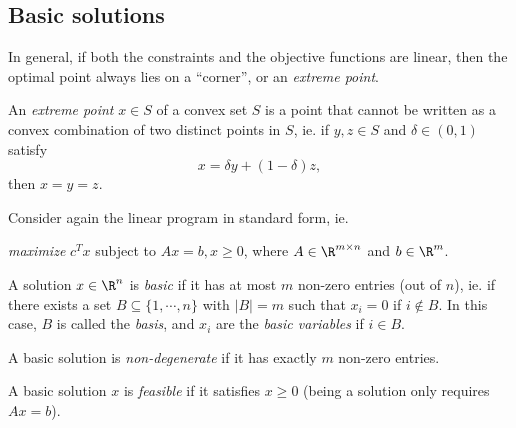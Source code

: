 \documentclass[a4paper]{article}
\begin{document}
\subsection{Basic solutions}
In general, if both the constraints and the objective functions are linear, then the optimal point always lies on a ``corner'', or an \emph{extreme point}.

\begin{defi}
  An \emph{extreme point} $x\in S$ of a convex set $S$ is a point that cannot be written as a convex combination of two distinct points in $S$, ie. if $y, z\in S$ and $\delta \in (0, 1)$ satisfy
  \[
    x = \delta y + (1 - \delta) z,
  \]
  then $x = y = z$.
\end{defi}

Consider again the linear program in standard form, ie.
\begin{center}
  \emph{maximize} $c^T x$ subject to $Ax = b, x \geq 0$, where $A \in \R^{m\times n}$ and $b\in \R^m$.
\end{center}

\begin{defi}
  A solution $x\in \R^n$ is \emph{basic} if it has at most $m$ non-zero entries (out of $n$), ie. if there exists a set $B\subseteq \{1, \cdots, n\}$ with $|B| = m$ such that $x_i = 0$ if $i\not\in B$. In this case, $B$ is called the \emph{basis}, and $x_i$ are the \emph{basic variables} if $i\in B$.
\end{defi}

\begin{defi}
  A basic solution is \emph{non-degenerate} if it has exactly $m$ non-zero entries.
\end{defi}

\begin{defi}
  A basic solution $x$ is \emph{feasible} if it satisfies $x \geq 0$ (being a solution only requires $Ax = b$).
\end{defi}
\end{document}
